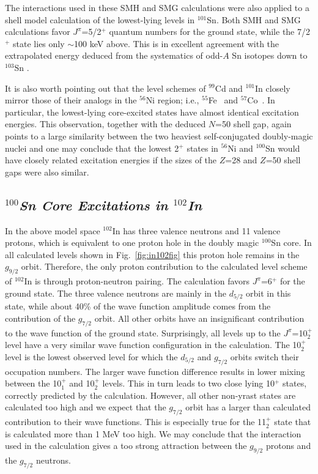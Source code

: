 \documentclass[twoside,12pt]{article}
\begin{document}
The interactions used in these SMH and SMG calculations 
were also applied
to a shell model calculation of the lowest-lying levels in $^{101}$Sn.
Both SMH and SMG calculations favor $J^{\pi}$=5/2$^+$ quantum numbers
for the ground state, while 
the 7/2$^+$ state lies only $\sim$100 keV above. This is in excellent agreement 
with the extrapolated energy deduced from the systematics
of odd-$A$ Sn isotopes down to $^{103}$Sn \cite{sn103}.

It is also worth pointing out that the level schemes of $^{99}$Cd and $^{101}$In 
closely mirror those of their analogs  
in the $^{56}$Ni region; i.e., $^{55}$Fe~\cite{fe55} and 
$^{57}$Co~\cite{co57}.
In particular, the lowest-lying core-excited states have almost identical 
excitation energies.
This observation, together with the deduced $N$=50 shell gap,
again points to a large similarity between the two heaviest self-conjugated 
doubly-magic nuclei and one may conclude that
the lowest 2$^+$ states in $^{56}$Ni and $^{100}$Sn would have closely
related excitation energies if the sizes of the $Z$=28 and $Z$=50 shell
gaps were also similar.

\subsection{\it $^{100}$Sn Core Excitations in $^{102}$In}
In the above model space $^{102}$In has three valence neutrons and 11 
valence protons, which is equivalent to one proton hole in the 
doubly magic $^{100}$Sn core. In all calculated levels shown in
Fig.~\ref{fig:in102fig} this proton hole remains in the $g_{9/2}$ orbit. Therefore,
the only proton contribution to the calculated level scheme of 
$^{102}$In is through proton-neutron pairing. 
The calculation favors $J^{\pi}$=6$^+$ for 
the ground state. The three valence neutrons are mainly in the
$d_{5/2}$ orbit in this state, while about 40\% of the wave function 
amplitude comes from the contribution of the $g_{7/2}$ orbit. All
other orbits have an insignificant contribution to the wave function
of the ground state. Surprisingly, all levels up to the $J^\pi$=10$^+_2$
level have a very similar wave function configuration in the calculation.
The 10$^+_2$ level is the lowest observed level for which the 
$d_{5/2}$ and $g_{7/2}$ orbits switch their occupation numbers. 
The larger wave function difference results in lower mixing between 
the 10$^+_1$ and 10$^+_2$ levels. This in turn leads to two close
lying 10$^+$ states, correctly predicted by the calculation.
However, all other non-yrast states are calculated too high and
we expect that the $g_{7/2}$ orbit has a larger than calculated
contribution to their wave functions. This is especially true for
the 11$^+_2$ state that is calculated more than 1 MeV too high.
We may conclude that the interaction used in the calculation
gives a too strong attraction between the $g_{9/2}$ protons
and the $g_{7/2}$ neutrons. 
  
\end{document}
